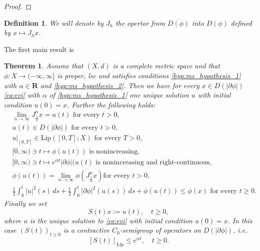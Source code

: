 \documentclass[a4paper,11pt, leqno]{scrreprt} %
\renewcommand{\leq}{\leqslant}
\renewcommand{\leq}{\leqslant}
\renewcommand{\geq}{\geqslant}
\newcommand{\R}{\mathbf R}
\theoremstyle{change}
\newcounter{acounter}[chapter]
\newtheorem{theorem}[acounter]{Theorem}
\newtheorem{definition}[acounter]{Definition}
\theoremstyle{nonumberplain}
\newtheorem{proof}{Proof}
\begin{document}
\begin{proof}
\end{proof}

\begin{definition}
  We will denote by $J_h$ the opertor from $\overline{D(\phi)}$ into
  $D(\phi)$ defined by $x \mapsto J_h x$.
\end{definition}

The first main result is
\begin{theorem}\label{th:ms_thm_1}
  Assume that $(X, d)$ is a complete metric space and that $\phi: X
  \to (-\infty, \infty]$ is proper, lsc and satisfies conditions
  \ref{hyp:ms_hypothesis_1} with $\alpha \in \R$ and
  \ref{hyp:ms_hypothesis_2}. Then we have for every $x \in D(|\partial
  \phi|)$ \eqref{eq:evi} with $\alpha$ of \ref{hyp:ms_hypothesis_1}
  one unique solution $u$ with initial condition $u(0) = x$. Further
  the following holds:
  \begin{align}
    \label{eq:ms_thm_1_1}
    &\lim_{n \to \infty} J_{\frac{t}{n}}^n x = u(t) \text{ for every $t
        > 0$,}\\
    \label{eq:ms_thm_1_2}
    &u(t) \in D(|\partial \phi|) \text{ for every $t > 0$,}\\  
    \label{eq:ms_thm_1_3}
    &u|_{[0, T]} \in \text{Lip}([0, T]; X) \text{ for every $T >
      0$,}\\
    \label{eq:ms_thm_1_4}
    &[0, \infty) \ni t \mapsto \phi(u(t)) \text{ is nonincreasing,}\\
    \label{eq:ms_thm_1_5}
    &[0, \infty) \ni t \mapsto e^{\alpha t} |\partial \phi|(u(t)
    \text{ is nonincreasing and right-continuous,}\\
    \label{eq:ms_thm_1_6}
    &\phi(u(t)) = \lim_{n \to \infty} \phi(J_{\frac{t}{n}}^n x) \text{
      for every $t > 0$,}\\
    \label{eq:ms_thm_1_7}
    &\frac12 \int_0^t |\dot u|^2(s) \, ds + \frac12 \int_0^t |\partial
    \phi|^2(u(s)) \, ds + \phi(u(t)) \leq \phi(x) \text{ for every $t \geq 0$.}
  \end{align}
  Finally we set
  \begin{equation}
    \label{eq:ms_thm_1_8}
    S(t)x := u(t), \quad t \geq 0,
  \end{equation}
  where $u$ is the unique solution to \eqref{eq:evi} with initial
  condition $u(0) = x$. In this case $(S(t))_{t \geq 0}$ is a contractive
  $C_0$-semigroup of operators on $D(|\partial \phi|)$, i.e.\
  \begin{equation}
    \label{eq:ms_thm_1_9}
    [S(t)]_\text{Lip} \leq e^{\alpha t}, \quad t \geq 0.
  \end{equation}
\end{theorem}
\end{document}
